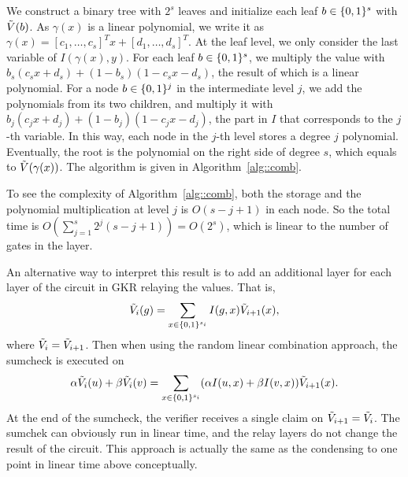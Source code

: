 We construct a binary tree with $2^s$ leaves and initialize each leaf $b\in\{0,1\}^s$ with $\tilde{V}(b)$. As $\gamma(x)$ is a linear polynomial, we write it as $\gamma(x) = [c_1, \ldots, c_s]^T x+ [d_1, \ldots, d_s]^T$. At the leaf level, we only consider the last variable of $I(\gamma(x), y)$. For each leaf $b\in\{0,1\}^s$, we multiply the value with $b_s(c_s x+ d_s)+(1-b_s)(1-c_s x- d_s)$, the result of which is a linear polynomial. For a node $b\in\{0,1\}^j$ in the intermediate level $j$, we add the polynomials from its two children, and multiply it with $b_j(c_j x+ d_j)+(1-b_j)(1-c_j x- d_j)$, the part in $I$ that corresponds to the $j$-th variable. In this way, each node in the $j$-th level stores a degree $j$ polynomial. Eventually, the root is the polynomial on the right side of degree $s$, which equals to $\tilde{V}(\gamma(x))$. The algorithm is given in Algorithm~\ref{alg::comb}. 

To see the complexity of Algorithm~\ref{alg::comb}, both the storage and the polynomial multiplication at level $j$ is $O(s-j+1)$ in each node. So the total time is $O(\sum_{j=1}^s 2^j (s-j+1)) = O(2^s)$, which is linear to the number of gates in the layer.

An alternative way to interpret this result is to add an additional layer for each layer of the circuit in GKR relaying the values. That is, $$\tilde{V}_{i}(g) = \sum_{x\in\{0,1\}^{s_i}}I(g,x)\tilde{V}_{i+1}(x),$$ where $\tilde{V}_i = \tilde{V}_{i+1}$. Then when using the random linear combination approach, the sumcheck is executed on $$\alpha\tilde{V}_{i}(u)+\beta\tilde{V}_i(v) = \sum_{x\in\{0,1\}^{s_i}}(\alpha I(u,x)+\beta I(v,x))\tilde{V}_{i+1}(x).$$
At the end of the sumcheck, the verifier receives a single claim on $\tilde{V}_{i+1} = \tilde{V}_{i}$. The sumchek can obviously run in linear time, and the relay layers do not change the result of the circuit. This approach is actually the same as the condensing to one point in linear time above conceptually. 




